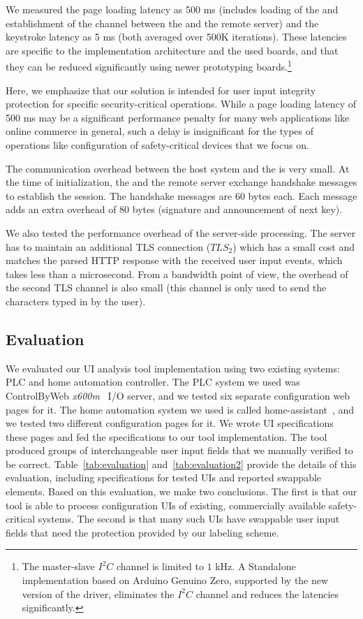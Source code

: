 We measured the page loading latency as 500 ms (includes loading of the \webusb \js and establishment of the \tls channel between the \device and the remote server) and the keystroke latency as 5 ms (both averaged over 500K iterations). These latencies are specific to the implementation architecture and the used boards, and that they can be reduced significantly using newer prototyping boards.\footnote{The master-slave $I^2C$ channel is limited to $1$ kHz. A Standalone implementation based on Arduino Genuino Zero, supported by the new version of the \webusb driver, eliminates the $I^2C$ channel and reduces the latencies significantly.} 

Here, we emphasize that our solution is intended for user input integrity protection for specific security-critical operations. While a page loading latency of 500 ms may be a significant performance penalty for many web applications like online commerce in general, such a delay is insignificant for the types of operations like configuration of safety-critical devices that we focus on.

The communication overhead between the host system and the \device is very small. At the time of initialization, the \device and the remote server exchange \tls handshake messages to establish the session. The handshake messages are 60 bytes each. Each \tls message adds an extra overhead of 80 bytes (signature and announcement of next key). 

We also tested the performance overhead of the server-side processing. The server has to maintain an additional TLS connection ($TLS_2$) which has a small cost and matches the parsed HTTP response with the received user input events, which takes less than a microsecond. 
From a bandwidth point of view, the overhead of the second TLS channel is also small (this channel is only used to send the characters typed in by the user).

\subsection{\tool Evaluation} 
\label{sec:results:framework}

We evaluated our UI analysis tool implementation using two existing systems: PLC and home automation controller. The PLC system we used was ControlByWeb \emph{x600m}~\cite{controlbyweb} I/O server, and we tested six separate configuration web pages for it. The home automation system we used is called home-assistant~\cite{ha}, and we tested two different configuration pages for it. We wrote UI specifications these pages and fed the specifications to our tool implementation. The tool produced groups of interchangeable user input fields that we manually verified to be correct. Table~\ref{tab:evaluation} and~\ref{tab:evaluation2} provide the details of this evaluation, including specifications for tested UIs and reported swappable elements. Based on this evaluation, we make two conclusions. The first is that our tool is able to process configuration UIs of existing, commercially available safety-critical systems. The second is that many such UIs have swappable user input fields that need the protection provided by our labeling scheme.

